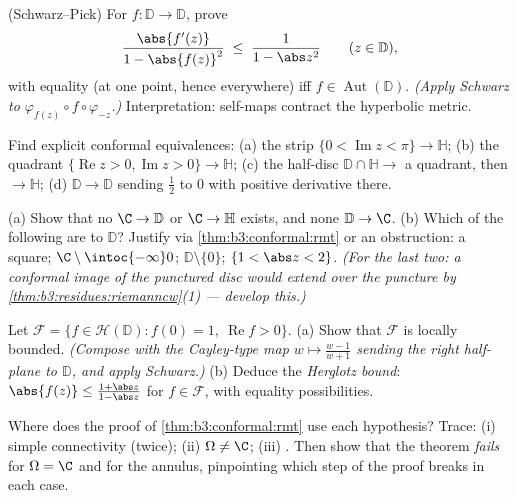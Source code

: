 \begin{exercise}[$\star\star$]\label{exo:b3:conformal:3}
(Schwarz--Pick) For  $f\colon \mathbb D \to
\mathbb D$, prove
\[
\frac{\abs{f'(z)}}{1 - \abs{f(z)}^2} \;\leq\;
\frac{1}{1 - \abs z^2}
\qquad (z \in \mathbb D),
\]
with equality (at one point, hence everywhere) iff $f \in
\operatorname{Aut}(\mathbb D)$.
\emph{(Apply Schwarz to $\varphi_{f(z)}\circ
f\circ\varphi_{-z}$.)} Interpretation:  self-maps
contract the hyperbolic metric.
\end{exercise}

\begin{exercise}[$\star\star$]\label{exo:b3:conformal:4}
Find explicit conformal equivalences:
(a) the strip $\{0 < \operatorname{Im}z < \pi\} \to \mathbb H$;
(b) the quadrant $\{\operatorname{Re}z > 0,
\operatorname{Im}z > 0\} \to \mathbb H$;
(c) the half-disc $\mathbb D\cap\mathbb H \to$ a quadrant,
then $\to \mathbb H$;
(d) $\mathbb D \to \mathbb D$ sending $\frac12$ to $0$ with
positive derivative there.
\end{exercise}

\begin{exercise}[$\star\star$]\label{exo:b3:conformal:5}
(a) Show that no  $\C \to \mathbb D$ or $\C \to
\mathbb H$ exists, and none $\mathbb D \to \C$.
(b) Which of the following are  to
$\mathbb D$? Justify via \cref{thm:b3:conformal:rmt} or an
obstruction: a square; $\C\setminus\intoc{-\infty}0$;
$\mathbb D\setminus\{0\}$; $\{1 < \abs z < 2\}$.
\emph{(For the last two: a conformal image of the punctured
disc would extend over the puncture by
\cref{thm:b3:residues:riemanncw}(1) --- develop this.)}
\end{exercise}

\begin{exercise}[$\star\star$]\label{exo:b3:conformal:6}
Let $\mathcal F = \{f \in \mathcal H(\mathbb D) : f(0) = 1,\
\operatorname{Re}f > 0\}$.
(a) Show that $\mathcal F$ is locally bounded.
\emph{(Compose with the Cayley-type map $w \mapsto \frac{w -
1}{w + 1}$ sending the right half-plane to $\mathbb D$, and
apply Schwarz.)}
(b) Deduce the \emph{Herglotz bound}: $\abs{f(z)} \leq
\frac{1 + \abs z}{1 - \abs z}$ for $f \in \mathcal F$, with
equality possibilities.
\end{exercise}

\begin{exercise}[$\star\star\star$]\label{exo:b3:conformal:7}
Where does the proof of \cref{thm:b3:conformal:rmt} use each
hypothesis? Trace: (i) simple connectivity (twice); (ii)
$\Omega \neq \C$; (iii) . Then show that the
theorem \emph{fails} for $\Omega = \C$ and for the annulus,
pinpointing which step of the proof breaks in each case.
\end{exercise}

